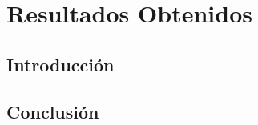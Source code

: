 
\chapter{Resultados Obtenidos }

\label{chap7:resultados}

\section{Introducción}

\section{Conclusión}

